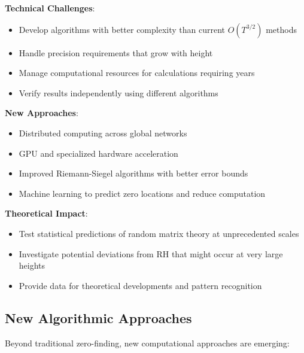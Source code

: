 \begin{research_direction}
\textbf{Technical Challenges}:
\begin{itemize}
\item Develop algorithms with better complexity than current $O(T^{3/2})$ methods
\item Handle precision requirements that grow with height
\item Manage computational resources for calculations requiring years
\item Verify results independently using different algorithms
\end{itemize}

\textbf{New Approaches}:
\begin{itemize}
\item Distributed computing across global networks
\item GPU and specialized hardware acceleration
\item Improved Riemann-Siegel algorithms with better error bounds
\item Machine learning to predict zero locations and reduce computation
\end{itemize}

\textbf{Theoretical Impact}:
\begin{itemize}
\item Test statistical predictions of random matrix theory at unprecedented scales
\item Investigate potential deviations from RH that might occur at very large heights
\item Provide data for theoretical developments and pattern recognition
\end{itemize}
\end{research_direction}

\subsection{New Algorithmic Approaches}
\label{subsec:new_algorithms}

Beyond traditional zero-finding, new computational approaches are emerging:

